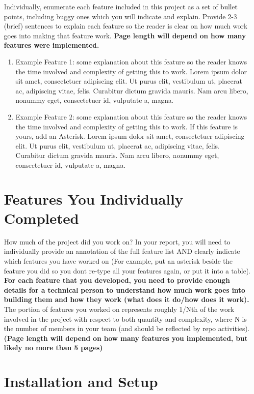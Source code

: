 \documentclass[]{article}
\begin{document}
Individually, enumerate each feature included in this project as a set
of bullet points, including buggy ones which you will indicate and
explain. Provide 2-3 (brief) sentences to explain each feature so the
reader is clear on how much work goes into making that feature work.
\textbf{Page length will depend on how many features were implemented.}

\begin{enumerate}
    \item Example Feature 1: some explanation about this feature so the reader
knows the time involved and complexity of getting this to work. Lorem
ipsum dolor sit amet, consectetuer adipiscing elit. Ut purus elit,
vestibulum ut, placerat ac, adipiscing vitae, felis. Curabitur dictum
gravida mauris. Nam arcu libero, nonummy eget, consectetuer id,
vulputate a, magna.
\item Example Feature 2: some explanation about this feature so the reader
knows the time involved and complexity of getting this to work. If this
feature is yours, add an Asterisk. Lorem ipsum dolor sit amet,
consectetuer adipiscing elit. Ut purus elit, vestibulum ut, placerat ac,
adipiscing vitae, felis. Curabitur dictum gravida mauris. Nam arcu
libero, nonummy eget, consectetuer id, vulputate a, magna.
\end{enumerate} 

\section{Features You Individually Completed}

How much of the project did you work on? In your report, you will need
to individually provide an annotation of the full feature list AND
clearly indicate which features you have worked on (For example, put an
asterisk beside the feature you did so you don\textquotesingle t re-type
all your features again, or put it into a table). \textbf{For each
feature that you developed, you need to provide enough details for a
technical person to understand how much work goes into building them and
how they work (what does it do/how does it work).} The portion of
features you worked on represents roughly 1/Nth of the work involved in
the project with respect to both quantity and complexity, where N is the
number of members in your team (and should be reflected by repo
activities). \textbf{(Page length will depend on how many features you
implemented, but likely no more than 5 pages)}

\section{Installation and Setup}
\end{document}
